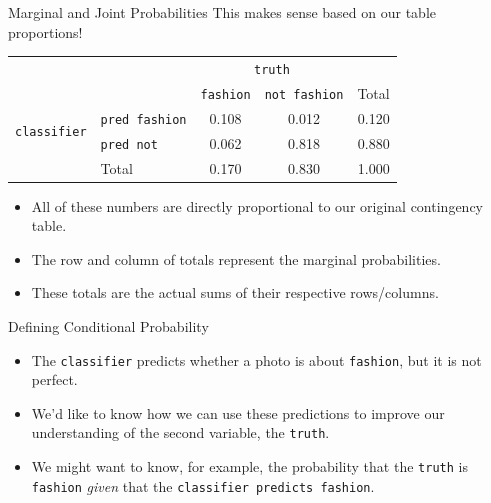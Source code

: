 \begin{frame}{Marginal and Joint Probabilities}
    This makes sense based on our table proportions!
    \begin{center}
        \begin{tabular}{r l cc r}
		& & \multicolumn{2}{c}{{\texttt{truth}}} & \\
        \cline{3-4}
		& & \texttt{fashion} & \texttt{not fashion} & Total  \\ 
        \cline{2-5}
        \multirow{2}{*}{{\texttt{classifier}}} 
        & \texttt{pred fashion}   & 0.108 & 0.012 & 0.120 \\ 
  		& \texttt{pred not}       & 0.062 & 0.818 & 0.880 \\ 
        \cline{2-5}
  		& Total	& 0.170 & 0.830 & 1.000 \\
        \cline{2-5}
    \end{tabular}
    \end{center}
    \begin{itemize}
        \item All of these numbers are directly proportional to our original contingency table.
        \item The row and column of totals represent the marginal probabilities.
        \item These totals are the actual sums of their respective rows/columns.
    \end{itemize}
\end{frame}

\begin{frame}{Defining Conditional Probability}
    \begin{itemize}
        \item The \texttt{classifier} predicts whether a photo is about \texttt{fashion}, but it is not perfect.
        \item We'd like to know how we can use these predictions to improve our understanding of the second variable, the \texttt{truth}.
        \item We might want to know, for example, the probability that the \texttt{truth} is \texttt{fashion} \textit{given} that the \texttt{classifier predicts fashion}. 
    \end{itemize}
\end{frame}

